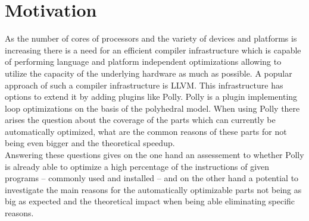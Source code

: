 \chapter{Motivation}
As the number of cores of processors and the variety of devices and platforms is increasing there is a need for an efficient compiler infrastructure which is capable of performing language and platform independent optimizations allowing to utilize the capacity of the underlying hardware as much as possible.
A popular approach of such a compiler infrastructure is LLVM. \cite{LLVMUsers}
This infrastructure has options to extend it by adding plugins like Polly.
Polly is a plugin implementing loop optimizations on the basis of the polyhedral model.
When using Polly there arises the question about the coverage of the parts which can currently be automatically optimized, what are the common reasons of these parts for not being even bigger and the theoretical speedup.\\
Answering these questions gives on the one hand an assessement to whether Polly is already able to optimize a high percentage of the instructions of given programs -- commonly used and installed -- and on the other hand a potential to investigate the main reasons for the automatically optimizable parts not being as big as expected and the theoretical impact when being able eliminating specific reasons.
